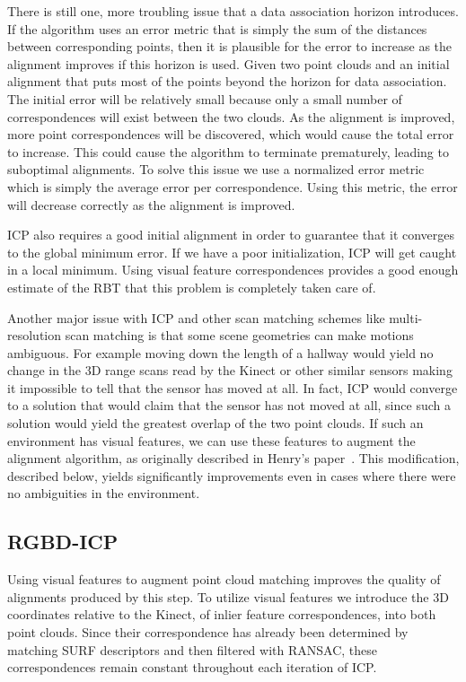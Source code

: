 \documentclass[letterpaper, 10pt, conference]{ieeeconf}
\begin{document}
	There is still one, more troubling issue that a data association horizon introduces.  If the algorithm uses an error metric that is simply the sum of the distances between corresponding points, then it is plausible for the error to increase as the alignment improves if this horizon is used.  Given two point clouds and an initial alignment that puts most of the points beyond the horizon for data association.  The initial error will be relatively small because only a small number of correspondences will exist between the two clouds.  As the alignment is improved, more point correspondences will be discovered, which would cause the total error to increase.  This could cause the algorithm to terminate prematurely, leading to suboptimal alignments.  To solve this issue we use a normalized error metric which is simply the average error per correspondence.  Using this metric, the error will decrease correctly as the alignment is improved.

	ICP also requires a good initial alignment in order to guarantee that it converges to the global minimum error.  If we have a poor initialization, ICP will get caught in a local minimum.  Using visual feature correspondences provides a good enough estimate of the RBT that this problem is completely taken care of.

	Another major issue with ICP and other scan matching schemes like multi-resolution scan matching is that some scene geometries can make motions ambiguous.  For example moving down the length of a hallway would yield no change in the 3D range scans read by the Kinect or other similar sensors making it impossible to tell that the sensor has moved at all.  In fact, ICP would converge to a solution that would claim that the sensor has not moved at all, since such a solution would yield the greatest overlap of the two point clouds.  If such an environment has visual features, we can use these features to augment the alignment algorithm, as originally described in Henry's paper~\cite{Henry2010RGBd}.  This modification, described below, yields significantly improvements even in cases where there were no ambiguities in the environment.

\subsection{RGBD-ICP}
Using visual features to augment point cloud matching improves the quality of alignments produced by this step.    To utilize visual features we introduce the 3D coordinates relative to the Kinect, of inlier feature correspondences, into both point clouds.  Since their correspondence has already been determined by matching SURF descriptors and then filtered with RANSAC, these correspondences remain constant throughout each iteration of ICP.
\end{document}
